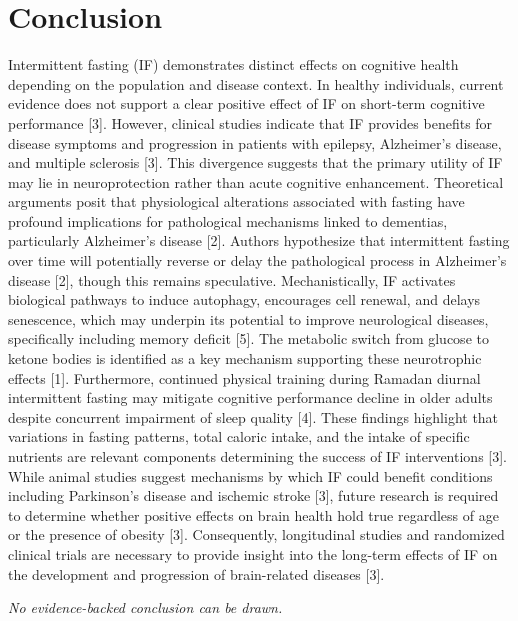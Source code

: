 \documentclass[11pt]{article}
\begin{document}
\section{Conclusion}
Intermittent fasting (IF) demonstrates distinct effects on cognitive health depending on the population and disease context. In healthy individuals, current evidence does not support a clear positive effect of IF on short-term cognitive performance [3]. However, clinical studies indicate that IF provides benefits for disease symptoms and progression in patients with epilepsy, Alzheimer's disease, and multiple sclerosis [3]. This divergence suggests that the primary utility of IF may lie in neuroprotection rather than acute cognitive enhancement. Theoretical arguments posit that physiological alterations associated with fasting have profound implications for pathological mechanisms linked to dementias, particularly Alzheimer's disease [2]. Authors hypothesize that intermittent fasting over time will potentially reverse or delay the pathological process in Alzheimer's disease [2], though this remains speculative. Mechanistically, IF activates biological pathways to induce autophagy, encourages cell renewal, and delays senescence, which may underpin its potential to improve neurological diseases, specifically including memory deficit [5]. The metabolic switch from glucose to ketone bodies is identified as a key mechanism supporting these neurotrophic effects [1]. Furthermore, continued physical training during Ramadan diurnal intermittent fasting may mitigate cognitive performance decline in older adults despite concurrent impairment of sleep quality [4]. These findings highlight that variations in fasting patterns, total caloric intake, and the intake of specific nutrients are relevant components determining the success of IF interventions [3]. While animal studies suggest mechanisms by which IF could benefit conditions including Parkinson's disease and ischemic stroke [3], future research is required to determine whether positive effects on brain health hold true regardless of age or the presence of obesity [3]. Consequently, longitudinal studies and randomized clinical trials are necessary to provide insight into the long-term effects of IF on the development and progression of brain-related diseases [3].

\textit{No evidence-backed conclusion can be drawn.}
\end{document}

